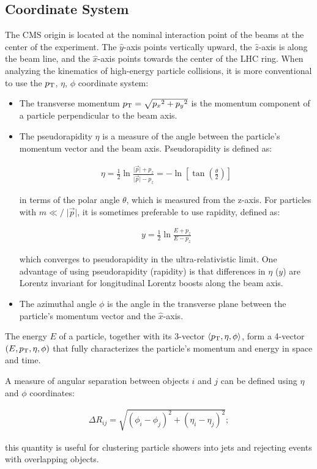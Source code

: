 \subsection{Coordinate System}
\label{CMS_Coordinate_System}
The CMS origin is located at the nominal interaction point of the beams at the center of the experiment.
The $\hat{y}$-axis points vertically upward, the $\hat{z}$-axis is along the beam line, and the $\hat{x}$-axis points towards the center of the LHC ring.
When analyzing the kinematics of high-energy particle collisions, it is more conventional to use the $p_{\mathrm{T}}$, $\eta$, $\phi$ coordinate system:
\begin{itemize}
\item The transverse momentum $p_{\mathrm{T}} = \sqrt {{p_x}^2+{p_y}^2}$ is the momentum component of a particle perpendicular to the beam axis. 
\item The pseudorapidity $\eta$ is a measure of the angle between the particle's momentum vector and the beam axis.
Pseudorapidity is defined as: 
\begin{linenomath*}
\begin{align}
\eta=\frac{1}{2} \ln \frac{\vert\vec{p}\vert+p_z}{\vert\vec{p}\vert-p_z}=-\ln \left[\tan \left(\frac{\theta}{2}\right)\right]
\end{align}
\end{linenomath*}
in terms of the polar angle $\theta$, which is measured from the z-axis.
For particles with $m {{\ll}\!\!\!\!/} \; \vert \vec{p} \vert$, it is sometimes preferable to use rapidity, defined as:
\begin{linenomath*}
\begin{align}
y=\frac{1}{2} \ln \frac{E+p_z}{E-p_z}
\label{Rapidity}
\end{align}
\end{linenomath*}
which converges to pseudorapidity in the ultra-relativistic limit.
One advantage of using pseudorapidity (rapidity) is that differences in $\eta$ ($y$) are Lorentz invariant for longitudinal Lorentz boosts along the beam axis.
\item The azimuthal angle $\phi$ is the angle in the transverse plane between the particle's momentum vector and the $\hat{x}$-axis.
\end{itemize}
The energy $E$ of a particle, together with its 3-vector $\langle p_{\mathrm{T}}, \eta, \phi \rangle$, form a 4-vector $(E,p_{\mathrm{T}}, \eta, \phi)$ that fully characterizes the particle's momentum and energy in space and time.

A measure of angular separation between objects $i$ and $j$ can be defined using $\eta$ and $\phi$ coordinates:
\begin{linenomath*}
\begin{align}
\Delta R_{ij} = \sqrt {{(\phi_i - \phi_j)}^2+{(\eta_i - \eta_j)}^2};
\label{DeltaR}
\end{align}
\end{linenomath*}
this quantity is useful for clustering particle showers into jets and rejecting events with overlapping objects.

